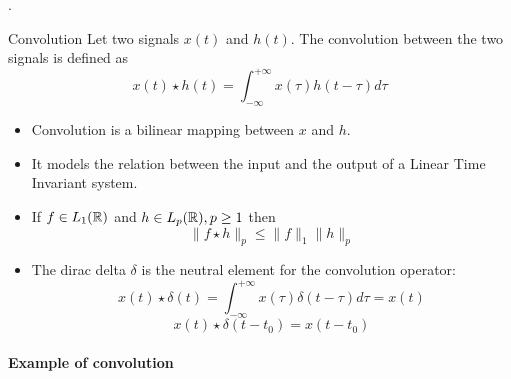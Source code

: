 .
\begin{block}{Convolution}
  Let two signals $x(t)$ and $h(t)$. The convolution between the two signals
  is defined as
  \begin{equation}
    x(t)\star h(t) =  \int_{-\infty}^{+\infty}x(\tau)h(t-\tau)d\tau
    \label{eq:convolution}
  \end{equation}\vspace{-5mm}
  \begin{itemize}
    \item Convolution is a bilinear mapping between $x$ and $h$.
    \item It models the relation between the input and the output of a Linear
    Time Invariant system.
    \item If $f\in L_1(\mathbb{R})$ and $h\in L_p(\mathbb{R}), p\geq1$ then
    $$ \|f\star h\|_p\leq\|f\|_1\|h\|_p $$
    \item The dirac delta $\delta$ is the neutral element for the convolution operator:
\begin{equation}
      \label{eq:dirac_conv}
     x(t)\star \delta(t) =\int_{-\infty}^{+\infty}x(\tau)\delta(t-\tau)d\tau=  x(t)
    \end{equation}
    \begin{equation}
      \label{eq:dirac_conv_tz}
     x(t)\star \delta(t-t_0) = x(t-t_0)
    \end{equation}
  \end{itemize}

\end{block}


\paragraph{Example of convolution}
 
